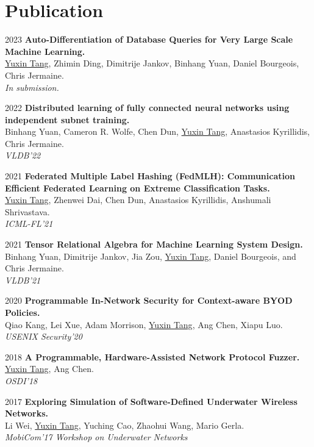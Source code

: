 \documentclass[12pt,letterpaper]{report}
\begin{document}
	\section*{Publication}
	\begin{tablist}
		\item[2023] \tab \textbf{Auto-Differentiation of Database Queries for Very Large Scale
		Machine Learning.}
		\\\underline{Yuxin Tang}, Zhimin Ding, Dimitrije Jankov, Binhang Yuan, Daniel Bourgeois, Chris Jermaine.
		\\\textit{In submission.}
		\item[2022] \tab \textbf{Distributed learning of fully connected neural networks using independent subnet training.} 
		\\Binhang Yuan, Cameron R. Wolfe, Chen Dun, \underline{Yuxin Tang}, Anastasios Kyrillidis, Chris Jermaine.
		\\\textit{VLDB'22} 
		\item[2021] \tab \textbf{Federated Multiple Label Hashing (FedMLH): Communication Efficient Federated Learning on Extreme Classification Tasks.} 
		\\ \underline{Yuxin Tang}, Zhenwei Dai, Chen Dun, Anastasios Kyrillidis, Anshumali Shrivastava.
		\\ \textit{ICML-FL'21}
		\item[2021] \tab  \textbf{Tensor Relational Algebra for Machine Learning System Design.} 
		\\Binhang Yuan, Dimitrije Jankov, Jia Zou, \underline{Yuxin Tang}, Daniel Bourgeois, and Chris Jermaine.
		\\\textit{VLDB'21}
		\item[2020] \tab \textbf{Programmable In-Network Security for Context-aware BYOD
		Policies.}
		\\Qiao Kang, Lei Xue, Adam Morrison, \underline{Yuxin Tang}, Ang Chen, Xiapu Luo.
		\\\textit{USENIX Security'20}
		\item[2018] \tab \textbf{A Programmable, Hardware-Assisted Network Protocol Fuzzer.}
		\\\underline{Yuxin Tang}, Ang Chen.
		\\\textit{OSDI'18} 
		\item[2017] \tab \textbf{Exploring Simulation of Software-Defined Underwater Wireless Networks.} 
		\\Li Wei, \underline{Yuxin Tang}, Yuching Cao, Zhaohui Wang, Mario Gerla.
		\\\textit{MobiCom'17 Workshop on Underwater Networks}
	\end{tablist}
	
\end{document}
